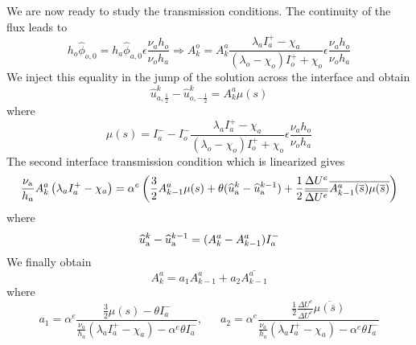 We are now ready to study the transmission conditions.
The continuity of the flux leads to
\begin{equation}
    h_o \widehat{\phi}_{o,0} = h_a \widehat{\phi}_{a,0}
    \epsilon\frac{\nu_a h_o}
    {\nu_o h_a}
    \Rightarrow
	A_k^o = A_k^a \frac{\lambda_a I_a^{+} - \chi_a}
	{(\lambda_o - \chi_o)I_o^{+} + \chi_o}
    \epsilon\frac{\nu_a h_o}
    {\nu_o h_a}
\end{equation}
We inject this equality in the jump of the solution across
the interface and obtain
\begin{equation}
    \widehat{u}_{a,\frac{1}{2}}^k - \widehat{u}_{o,-\frac{1}{2}}^k
    = A_k^a \mu(s)
\end{equation}
where
\begin{equation}
	\mu(s) = I_a^{-} - I_o^{-}
\frac{\lambda_a I_a^{+} - \chi_a}
	{(\lambda_o - \chi_o)I_o^{+} + \chi_o}
    \epsilon\frac{\nu_a h_o}
    {\nu_o h_a}
\end{equation}
The second interface transmission condition which
is linearized gives
\begin{equation}
\frac{\nu_{\rm a}}{h_a}A_k^a \left(\lambda_a I_a^{+} - \chi_a \right)
	=  \alpha^e \left(\frac{3}{2}A_{k-1}^a \mu(s)
+\theta ( \widehat{u}_{\rm a}^{k} -  \widehat{u}_{\rm a}^{k-1})
+ \frac{1}{2}\frac{\Delta U^e}{\overline{\Delta U^e}}
\overline{A_{k-1}^a(\overline{s}) \mu(\overline{s})}
\right)
\end{equation}
where
\begin{equation}
	\widehat{u}_{\rm a}^{k} -  \widehat{u}_{\rm a}^{k-1} = (A_k^a - A_{k-1}^a)I_a^{-}
\end{equation}
We finally obtain
\begin{equation}
    A_k^a = a_1 A_{k-1}^a + a_2 \overline{A_{k-1}^a}
\end{equation}
where
\begin{equation}
    a_1 = \alpha^e\frac{\frac{3}{2}\mu(s) - \theta I_a^{-}}
	{\frac{\nu_a}{h_a}\left(\lambda_a I_a^{+} - \chi_a \right)
	- \alpha^e \theta I_a^{-}}, ~~~~~~~
        a_2 = \alpha^e\frac{\frac{1}{2}\frac{\Delta U^e}{\overline{\Delta U^e}}
 \overline{\mu(\overline{s})}}
	{\frac{\nu_a}{h_a}\left(\lambda_a I_a^{+} - \chi_a \right)
	- \alpha^e \theta I_a^{-}}
\end{equation}
